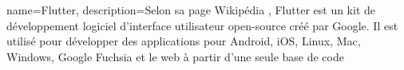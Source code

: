 {
        name=Flutter,
        description={Selon sa page Wikipédia \cite{flutter_wiki}, Flutter est un kit de développement logiciel d'interface utilisateur open-source créé par Google. Il est utilisé pour développer des applications pour Android, iOS, Linux, Mac, Windows, Google Fuchsia et le web à partir d'une seule base de code}
}
